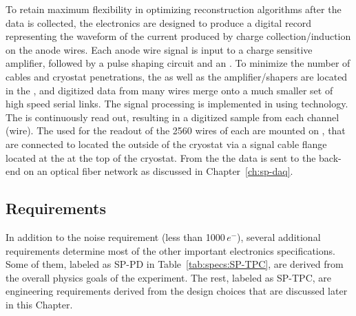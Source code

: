 To retain maximum flexibility in optimizing reconstruction algorithms after 
the  data is collected, the  electronics are designed 
to produce a digital record representing the waveform of the current produced 
by charge collection/induction on the anode wires.  Each anode wire signal is 
input to a charge sensitive amplifier, followed by a pulse shaping circuit and 
an .  To minimize the number of cables and cryostat penetrations, 
the  as well as the amplifier/shapers are located in the , 
and digitized data from many wires merge onto a much smaller set of high speed 
serial links. The  signal processing is implemented in 
using  technology.  The  is continuously 
read out, resulting in a digitized  sample from each  
channel (wire). The  used for the readout of the \num{2560}
wires of each  are mounted on , that are connected to
 located the outside of the cryostat via a  signal 
cable flange located at the  \fdth at the top of the cryostat.
From the  the data is sent to the  back-end on
an optical fiber network as discussed in Chapter~\ref{ch:sp-daq}.

\subsection{Requirements}
\label{sec:fdsp-tpcelec-overview-requirements}


In addition to the noise requirement (less than \num{1000}\,$e^{-}$), several 
additional requirements determine most of the other important  
electronics specifications. Some of them, labeled as SP-PD in Table~\ref{tab:specs:SP-TPC},
are derived from the overall physics goals of the experiment. The rest, labeled
as SP-TPC, are engineering requirements derived from the design choices that
are discussed later in this Chapter.


